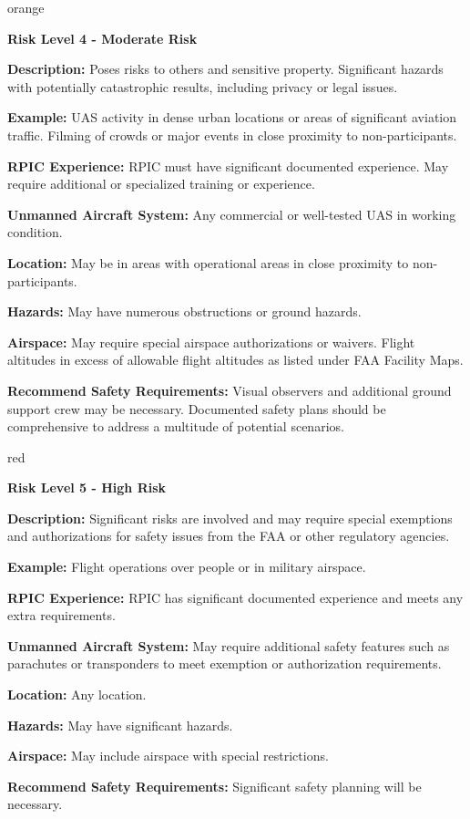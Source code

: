 \documentclass[
]{book}
\begin{document}
\begin{content-box}{orange}

\textbf{Risk Level 4 - Moderate Risk}

\textbf{Description:} Poses risks to others and sensitive property. Significant hazards with potentially catastrophic results, including privacy or legal issues.

\textbf{Example:} UAS activity in dense urban locations or areas of significant aviation traffic. Filming of crowds or major events in close proximity to non-participants.

\textbf{RPIC Experience:} RPIC must have significant documented experience. May require additional or specialized training or experience.

\textbf{Unmanned Aircraft System:} Any commercial or well-tested UAS in working condition.

\textbf{Location:} May be in areas with operational areas in close proximity to non-participants.

\textbf{Hazards:} May have numerous obstructions or ground hazards.

\textbf{Airspace:} May require special airspace authorizations or waivers. Flight altitudes in excess of allowable flight altitudes as listed under FAA Facility Maps.

\textbf{Recommend Safety Requirements:} Visual observers and additional ground support crew may be necessary. Documented safety plans should be comprehensive to address a multitude of potential scenarios.

\end{content-box}

\begin{content-box}{red}

\textbf{Risk Level 5 - High Risk}

\textbf{Description:} Significant risks are involved and may require special exemptions and authorizations for safety issues from the FAA or other regulatory agencies.

\textbf{Example:} Flight operations over people or in military airspace.

\textbf{RPIC Experience:} RPIC has significant documented experience and meets any extra requirements.

\textbf{Unmanned Aircraft System:} May require additional safety features such as parachutes or transponders to meet exemption or authorization requirements.

\textbf{Location:} Any location.

\textbf{Hazards:} May have significant hazards.

\textbf{Airspace:} May include airspace with special restrictions.

\textbf{Recommend Safety Requirements:} Significant safety planning will be necessary.

\end{content-box}
\end{document}

